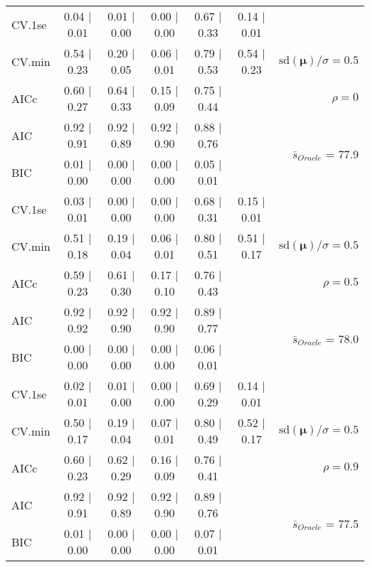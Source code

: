 \begin{table}
\begin{center}
\begin{tabular}{l*{5}{c}|r}
 \hline 
CV.1se & 0.04 $\mid$ 0.01 & 0.01 $\mid$ 0.00 & 0.00 $\mid$ 0.00 & 0.67 $\mid$ 0.33 & 0.14 $\mid$ 0.01 & \\
CV.min & 0.54 $\mid$ 0.23 & 0.20 $\mid$ 0.05 & 0.06 $\mid$ 0.01 & 0.79 $\mid$ 0.53 & 0.54 $\mid$ 0.23 &  $\mathrm{sd}(\mathbf{\mu})/\sigma=0.5$ \\
AICc & 0.60 $\mid$ 0.27 & 0.64 $\mid$ 0.33 & 0.15 $\mid$ 0.09 & 0.75 $\mid$ 0.44 & & $\rho=0$ \\
AIC & 0.92 $\mid$ 0.91 & 0.92 $\mid$ 0.89 & 0.92 $\mid$ 0.90 & 0.88 $\mid$ 0.76 & &  \multirow{2}{*}{$\bar{s}_{Oracle}$ = 77.9} \\
BIC & 0.01 $\mid$ 0.00 & 0.00 $\mid$ 0.00 & 0.00 $\mid$ 0.00 & 0.05 $\mid$ 0.01 & &  \\
 \hline 
CV.1se & 0.03 $\mid$ 0.01 & 0.00 $\mid$ 0.00 & 0.00 $\mid$ 0.00 & 0.68 $\mid$ 0.31 & 0.15 $\mid$ 0.01 & \\
CV.min & 0.51 $\mid$ 0.18 & 0.19 $\mid$ 0.04 & 0.06 $\mid$ 0.01 & 0.80 $\mid$ 0.51 & 0.51 $\mid$ 0.17 &  $\mathrm{sd}(\mathbf{\mu})/\sigma=0.5$ \\
AICc & 0.59 $\mid$ 0.23 & 0.61 $\mid$ 0.30 & 0.17 $\mid$ 0.10 & 0.76 $\mid$ 0.43 & & $\rho=0.5$ \\
AIC & 0.92 $\mid$ 0.92 & 0.92 $\mid$ 0.90 & 0.92 $\mid$ 0.90 & 0.89 $\mid$ 0.77 & &  \multirow{2}{*}{$\bar{s}_{Oracle}$ = 78.0} \\
BIC & 0.00 $\mid$ 0.00 & 0.00 $\mid$ 0.00 & 0.00 $\mid$ 0.00 & 0.06 $\mid$ 0.01 & &  \\
 \hline 
CV.1se & 0.02 $\mid$ 0.01 & 0.01 $\mid$ 0.00 & 0.00 $\mid$ 0.00 & 0.69 $\mid$ 0.29 & 0.14 $\mid$ 0.01 & \\
CV.min & 0.50 $\mid$ 0.17 & 0.19 $\mid$ 0.04 & 0.07 $\mid$ 0.01 & 0.80 $\mid$ 0.49 & 0.52 $\mid$ 0.17 &  $\mathrm{sd}(\mathbf{\mu})/\sigma=0.5$ \\
AICc & 0.60 $\mid$ 0.23 & 0.62 $\mid$ 0.29 & 0.16 $\mid$ 0.09 & 0.76 $\mid$ 0.41 & & $\rho=0.9$ \\
AIC & 0.92 $\mid$ 0.91 & 0.92 $\mid$ 0.89 & 0.92 $\mid$ 0.90 & 0.89 $\mid$ 0.76 & &  \multirow{2}{*}{$\bar{s}_{Oracle}$ = 77.5} \\
BIC & 0.01 $\mid$ 0.00 & 0.00 $\mid$ 0.00 & 0.00 $\mid$ 0.00 & 0.07 $\mid$ 0.01 & &  \\
 \hline 
\end{tabular}
\end{center}
\vspace{-1cm}
\end{table}




